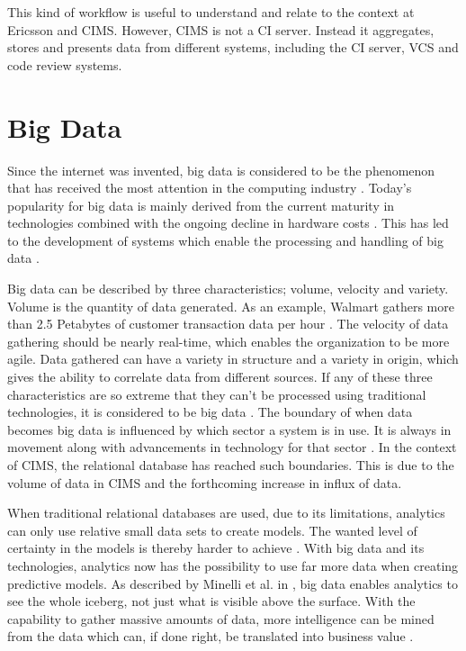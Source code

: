 This kind of workflow is useful to understand and relate to the context at Ericsson and CIMS. However, CIMS is not a CI server. Instead it aggregates, stores and presents data from different systems, including the CI server, VCS and code review systems.

\section{Big Data}
Since the internet was invented, big data is considered to be the phenomenon that has received the most attention in the computing industry \cite{bigDataWarehouse}. Today's popularity for big data is mainly derived from the current maturity in technologies combined with the ongoing decline in hardware costs \cite{bigDataWarehouse, bigDatabigAn}. This has led to the development of systems which enable the processing and handling of big data \cite{bigDataWarehouse}.

Big data can be described by three characteristics; volume, velocity and variety. Volume is the quantity of data generated. As an example, Walmart gathers more than 2.5 Petabytes of customer transaction data per hour \cite{bigDataMane}. The velocity of data gathering should be nearly real-time, which enables the organization to be more agile. Data gathered can have a variety in structure and a variety in origin, which gives the ability to correlate data from different sources. If any of these three characteristics are so extreme that they can't be processed using traditional technologies, it is considered to be big data \cite{bigDataWarehouse}. The boundary of when data becomes big data is influenced by which sector a system is in use. It is always in movement along with advancements in technology for that sector \cite{bigDatabigAn}. In the context of CIMS, the relational database has reached such boundaries. This is due to the volume of data in CIMS and the forthcoming increase in influx of data.  

When traditional relational databases are used, due to its limitations, analytics can only use relative small data sets to create models. The wanted level of certainty in the models is thereby harder to achieve \cite{bigDatabigAn}. With big data and its technologies, analytics now has the possibility to use far more data when creating predictive models. As described by Minelli et al. in \cite{bigDatabigAn}, big data enables analytics to see the whole iceberg, not just what is visible above the surface. With the capability to gather massive amounts of data, more intelligence can be mined from the data which can, if done right, be translated into business value \cite{bigDataMane}.

